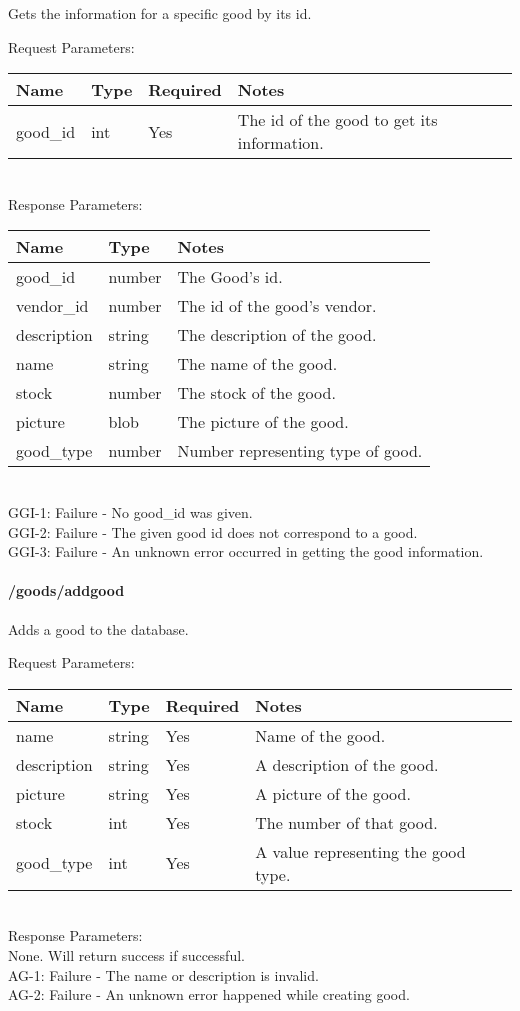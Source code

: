 \documentclass{article}[11pt]
\begin{document}
Gets the information for a specific good by its id.

\noindent
Request Parameters:

\noindent
\begin{tabular}{|l|l|l|l|}
\hline
\textbf{Name} & \textbf{Type} & \textbf{Required} & \textbf{Notes} \\
\hline
good\_id & int & Yes & The id of the good to get its information. \\
\hline
\end{tabular} \\

\noindent
Response Parameters: \\

\noindent
\begin{tabular}{|l|l|l|}
\hline
\textbf{Name} & \textbf{Type} & \textbf{Notes} \\
\hline
good\_id & number & The Good's id. \\
vendor\_id & number & The id of the good's vendor. \\
description & string & The description of the good. \\
name & string & The name of the good. \\
stock & number & The stock of the good. \\
picture & blob & The picture of the good. \\
good\_type & number & Number representing type of good. \\
\hline
\end{tabular} \\

\ErrorsSession
GGI-1: Failure - No good\_id was given. \\
GGI-2: Failure - The given good id does not correspond to a good. \\
GGI-3: Failure - An unknown error occurred in getting the good information. \\

\paragraph{/goods/addgood}\textbf{}

Adds a good to the database.

\noindent
Request Parameters:

\noindent
\begin{tabular}{|l|l|l|l|}
\hline
\textbf{Name} & \textbf{Type} & \textbf{Required} & \textbf{Notes} \\
\hline
name & string & Yes & Name of the good. \\
description & string & Yes & A description of the good. \\
picture & string & Yes & A picture of the good. \\
stock & int & Yes & The number of that good. \\
good\_type & int & Yes & A value representing the good type. \\
\hline
\end{tabular} \\

\noindent
Response Parameters: \\
None. Will return success if successful. \\

\ErrorsSession
AG-1: Failure - The name or description is invalid. \\
AG-2: Failure - An unknown error happened while creating good. \\
\end{document}
